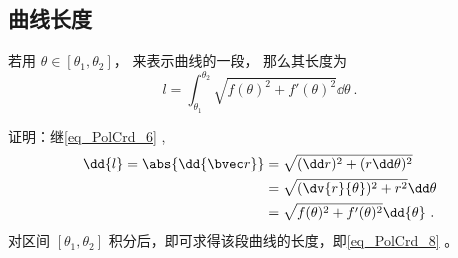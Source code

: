 \subsection{曲线长度}

若用 $\theta \in [\theta_1, \theta_2]$， 来表示曲线的一段， 那么其长度为
\begin{equation}\label{eq_PolCrd_8}
l = \int_{\theta_1}^{\theta_2} \sqrt{f(\theta)^2 + f'(\theta)^2} \dd{\theta}~.
\end{equation}

证明：继\autoref{eq_PolCrd_6} ,
\begin{align}
\dd{l} = \abs{\dd{\bvec r}} &=\sqrt{(\dd r)^2 + (r \dd \theta)^2} \\
&=\sqrt{(\dv {r}{\theta} )^2 + r^2} \dd \theta \\
&=\sqrt{f(\theta)^2 + f'(\theta)^2} \dd{\theta}~.
\end{align}
对区间 $[\theta_1,\theta_2]$ 积分后，即可求得该段曲线的长度，即\autoref{eq_PolCrd_8} 。